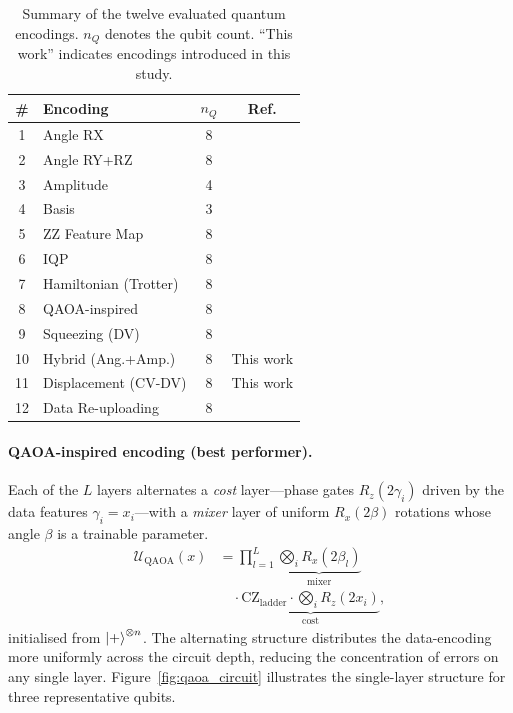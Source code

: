 \documentclass[twocolumn,aps,pra,superscriptaddress,floatfix]{revtex4-2}
\begin{document}
\begin{table}[ht]
\centering
\caption{%
  Summary of the twelve evaluated quantum encodings.
  $n_Q$ denotes the qubit count.
  ``This work'' indicates encodings introduced in this study.
}
\label{tab:encodings}
\renewcommand{\arraystretch}{1.15}
\begin{tabular}{@{}clcc@{}}
\toprule
\textbf{\#} & \textbf{Encoding} & $n_Q$ & \textbf{Ref.} \\
\midrule
1  & Angle RX              & 8 & \cite{schuld2021kernel} \\ %
2  & Angle RY+RZ           & 8 & \cite{perezSalinas2020} \\
3  & Amplitude             & 4 & \cite{mottonen2004} \\
4  & Basis                 & 3 & \cite{nielsen2010} \\
5  & ZZ Feature Map        & 8 & \cite{havlicek2019} \\
6  & IQP                   & 8 & \cite{shepherd2009} \\
7  & Hamiltonian (Trotter) & 8 & \cite{lloyd2020} \\
8  & QAOA-inspired         & 8 & \cite{farhi2014} \\
9  & Squeezing (DV)        & 8 & \cite{killoran2019} \\
10 & Hybrid (Ang.+Amp.)    & 8 & This work \\
11 & Displacement (CV-DV)  & 8 & This work \\
12 & Data Re-uploading     & 8 & \cite{perezSalinas2020} \\
\bottomrule
\end{tabular}
\end{table}

\paragraph{QAOA-inspired encoding (best performer).}
Each of the $L$ layers alternates a \emph{cost} layer---phase gates
$R_z(2\gamma_i)$ driven by the data features $\gamma_i = x_i$---with a
\emph{mixer} layer of uniform $R_x(2\beta)$ rotations whose angle $\beta$
is a trainable parameter.
\begin{align}
  \mathcal{U}_\text{QAOA}(x)
    &= \prod_{l=1}^{L}
       \underbrace{\bigotimes_{i}R_x(2\beta_l)}_{\text{mixer}}
       \nonumber\\
    &\quad\cdot
       \underbrace{\mathrm{CZ}_\text{ladder}
                   \cdot\bigotimes_{i}R_z(2x_i)}_{\text{cost}},
\end{align}
initialised from $\ket{+}^{\otimes n}$.
The alternating structure distributes the data-encoding more uniformly across
the circuit depth, reducing the concentration of errors on any single layer.
Figure~\ref{fig:qaoa_circuit} illustrates the single-layer structure for three
representative qubits.
\end{document}
